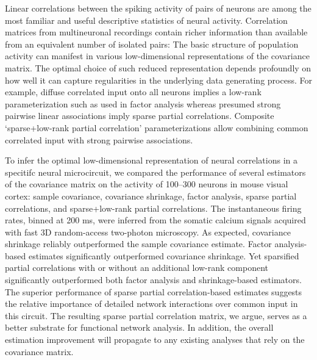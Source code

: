 Linear correlations between the spiking activity of pairs of neurons are among the most familiar and useful descriptive statistics of neural activity.
Correlation matrices from multineuronal recordings contain richer information than available from an equivalent number of isolated pairs:
The basic structure of population activity can manifest in various low-dimensional representations of the covariance matrix.    The optimal choice of such reduced representation  depends profoundly on how well it can capture regularities in the underlying data generating process. 
For example, diffuse correlated input onto all neurons implies a low-rank parameterization such as used in  factor analysis whereas presumed strong pairwise linear associations imply sparse partial correlations.  
Composite  `sparse+low-rank partial correlation' parameterizations allow combining common correlated input with strong pairwise associations.  

To infer the optimal low-dimensional representation of neural correlations in a specitifc neural microcircuit, we compared the performance of several estimators of the covariance matrix on the activity of 100--300 neurons in mouse visual cortex: sample covariance, covariance shrinkage, factor analysis, sparse partial correlations, and sparse+low-rank partial correlations. 
The instantaneous firing rates, binned at 200 ms, were inferred from the somatic calcium signals acquired with fast 3D random-access two-photon microscopy.   
As expected, covariance shrinkage reliably outperformed the sample covariance estimate. 
Factor analysis-based estimates significantly outperformed covariance shrinkage. 
Yet sparsified partial correlations with or without an additional low-rank component significantly outperformed both factor analysis and shrinkage-based  estimators. 
The superior performance of sparse partial correlation-based estimates suggests the relative importance of detailed network interactions over common input in this circuit.
The resulting sparse partial correlation matrix, we argue, serves as a better substrate for functional network analysis. 
In addition, the overall estimation improvement will propagate to any existing analyses that rely on the covariance matrix.
